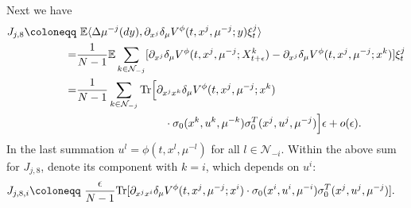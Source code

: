 \documentclass{amsart}
\theoremstyle{definition}
\theoremstyle{remark}
\def\cal{\mathcal}
\def\EE{{\mathbb E}}
\def\deltae{\epsilon}
\numberwithin{equation}{section}
\begin{document}
Next we have
\begin{align*}
J_{j,8}\coloneqq&\ \EE \langle \Delta\mu^{-j}(dy) ,
 \partial_{x^j}\delta_{\mu}V^\phi (t, x^j, \mu^{-j}; y)\xi_t^j \rangle \\
=&\frac{1}{N-1}\EE \sum_{k\in {\mathcal N}_{-j}   }
[  \partial_{x^j}\delta_{\mu}V^\phi (t, x^j, \mu^{-j};
X_{t+\deltae}^k)-\partial_{x^j}\delta_{\mu} V^\phi (t, x^j,
\mu^{-j}; x^k)]\xi_t^j \\
=& \frac{1}{N-1} \sum_{k\in {\mathcal N}_{-j}} {\rm Tr}\Big[\partial_{x^jx^k} \delta_{\mu} V^\phi(t,x^j, \mu^{-j}; x^k)\\
&\qquad\qquad\qquad\qquad\cdot \sigma_0(x^k, u^k, \mu^{-k})\sigma_0^T(x^j, u^j, \mu^{-j})\Big]\deltae+o(\deltae).
\end{align*}
In the last summation $u^l=\phi(t, x^l, \mu^{-l})$ for all $l\in {\cal N}_{-i}$.
Within the above sum for $J_{j,8}$, denote its component with $k=i$, which depends on $u^i$:
\begin{align*}
J_{j,8,i}\coloneqq &\  \frac{\epsilon}{N-1} {\rm Tr}[\partial_{x^jx^i} \delta_{\mu} V^\phi(t,x^j, \mu^{-j}; x^i) \cdot \sigma_0(x^i, u^i, \mu^{-i})\sigma_0^T(x^j, u^j, \mu^{-j})].
\end{align*}
\end{document}
